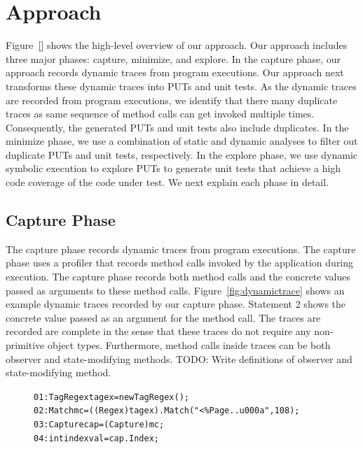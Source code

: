 \section{Approach}
\label{sec:approach}

Figure~\ref{} shows the high-level overview of our approach. Our approach
includes three major phases: capture, minimize, and explore. In the
capture phase, our approach records dynamic traces from program executions.
Our approach next transforms these dynamic traces into
PUTs and unit tests. As the dynamic traces are recorded from program
executions, we identify that there many duplicate traces as same 
sequence of method calls can get invoked multiple times. Consequently,
the generated PUTs and unit tests also include duplicates.
In the minimize phase, we use a combination of static and dynamic
analyses to filter out duplicate PUTs and unit tests, respectively.
In the explore phase, we use dynamic symbolic execution to explore
PUTs to generate unit tests that achieve a high code coverage
of the code under test. We next explain each phase in detail.

\subsection{Capture Phase}
\label{sec:capture}

The capture phase records dynamic traces from program executions. The capture
phase uses a profiler that records method calls invoked by the application
during execution. The capture phase records both method calls and the concrete
values passed as arguments to these method calls. Figure~\ref{fig:dynamictrace} shows
an example dynamic traces recorded by our capture phase. Statement 2
shows the concrete value  passed as an argument
for the  method call. The traces are recorded
are complete in the sense that these traces do not require any non-primitive
object types. Furthermore, method calls inside traces can be both
observer and state-modifying methods. TODO: Write definitions 
of observer and state-modifying method. 

\begin{figure}[t]
\begin{CodeOut}
\begin{alltt}
01: TagRegex tagex = new TagRegex();
02: Match mc = ((Regex)tagex).Match("<\%\@ Page..u000a",108);
03: Capture cap = (Capture) mc;
04: int indexval = cap.Index;
\end{alltt}
\end{CodeOut}\vspace*{-3ex}
\vspace*{-3ex}
\end{figure}

